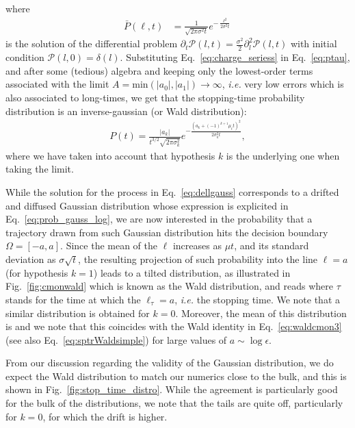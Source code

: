 where
\begin{align}\label{eq:Pheat}
\bar{P}(\ell,t) &= \frac{1}{\sqrt{2\pi \sigma^2 t}} e^{-\frac{\ell^{2} }{2 \sigma^2 t}}
\end{align}
is the solution of the differential problem $\partial_{t}\mathcal{P}(l,t)= \frac{\sigma^2}{2} \partial_{l}^{2}\mathcal{P}(l,t)$ with initial condition $\mathcal{P}(l,0)=\delta(l)$. Substituting Eq.~\eqref{eq:charge_seriess} in Eq.~\eqref{eq:ptau}, and after some (tedious) algebra and keeping only the lowest-order terms associated with the limit $A = \text{min}(|a_0|, |a_1|) \rightarrow \infty$, \textit{i.e.} very low errors which is also associated to long-times, we get that the stopping-time probability distribution is an inverse-gaussian (or Wald distribution):
\begin{align}
P(t) = \frac{|a_k|}{t^{3/2}\sqrt{2\pi \sigma^2_k}}e^{-\frac{(a_k + (-1)^{k+1} \mu_t t)^{2}}{2 \sigma^2_k t}},
\end{align}
where we have taken into account that hypothesis $k$ is the underlying one when taking the limit.

While the solution for the process in Eq.~\ref{eq:dellgauss} corresponds to a drifted and diffused Gaussian distribution whose expression is explicited in Eq.~\ref{eq:prob_gauss_log}, we are now interested in the probability that a trajectory drawn from such Gaussian distribution hits the decision boundary $\Omega = [-a,a]$. Since the mean of the $\ell$ increases as $\mu t$, and its standard deviation as $\sigma \sqrt{t}$, the resulting projection of such probability into the line $\ell=a$ (for hypothesis $k=1$) leads to a tilted distribution, as illustrated in Fig.~\ref{fig:cmonwald} which is known as the Wald distribution, and reads
where $\tau$ stands for the time at which the $\ell_\tau = a$, \textit{i.e.} the stopping time. We note that a similar distribution is obtained for $k=0$.  Moreover, the mean of this distribution is
and we note that this coincides with the Wald identity in Eq.~\ref{eq:waldcmon3} (see also Eq.~\ref{eq:sptrWaldsimple}) for large values of $a\sim\log\epsilon$.

From our discussion regarding the validity of the Gaussian distribution, we do expect the Wald distribution to match our numerics close to the bulk, and this is shown in Fig.~\ref{fig:stop_time_distro}. While the agreement is particularly good for the bulk of the distributions, we note that the tails are quite off, particularly for $k=0$, for which the drift is higher.

